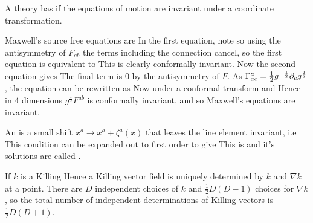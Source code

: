 \documentclass{article}
\begin{document}
\begin{definition}
A theory has  if the equations of motion are invariant under a coordinate transformation.
\end{definition}

\begin{example}
Maxwell's source free equations are 
In the first equation, note 
so using the antisymmetry of $F_{ab}$ the terms including the connection cancel, so the first equation is equivalent to 
This is clearly conformally invariant. Now the second equation gives 
The final term is 0 by the antisymmetry of $F$. As $\Gamma^a_{ac} =\frac{1}{2} g^{-\frac{1}{2}} \partial_c g^\frac{1}{2}$, the equation can be rewritten as 
Now under a conformal transform 
and 
Hence in 4 dimensions $g^\frac{1}{2}F^{ab}$ is conformally invariant, and so Maxwell's equations are invariant. 
\end{example}

\begin{definition}
An  is a small shift $x^a \to x^a + \zeta^a(x)$ that leaves the line element invariant, i.e
This condition can be expanded out to first order to give 
This is  and it's solutions are called .
\end{definition}

\begin{lemma}
If $k$ is a Killing 
Hence a Killing vector field is uniquely determined by $k$ and $\nabla k$ at a point. There are $D$ independent choices of $k$ and $\frac{1}{2}D(D-1)$ choices for $\nabla k$, so the total number of independent determinations of Killing vectors is $\frac{1}{2}D(D+1)$. 
\end{lemma}
\end{document}
